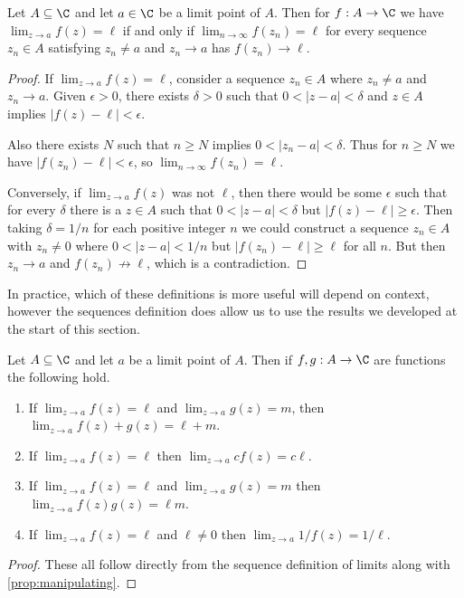\begin{proposition}
	Let $A \subseteq \C$ and let $a \in \C$ be a limit point of $A$. Then for $f:A \rightarrow \C$ we have $\displaystyle\lim_{z \to a} f(z) = \ell$ if and only if $\lim_{n \to \infty} f(z_n) = \ell$ for every sequence $z_n \in A$ satisfying $z_n \neq a$ and $z_n \rightarrow a$ has $f(z_n) \rightarrow \ell$.
\end{proposition}
\begin{proof}
If $\lim_{z \to a} f(z) = \ell$, consider a sequence $z_n \in A$ where $z_n \neq a$ and $z_n \rightarrow a$.
Given $\epsilon > 0$, there exists $\delta > 0$ such that $0 < |z - a| < \delta$ and $z \in A$ implies $|f(z) - \ell| < \epsilon$.

Also there exists $N$ such that $n \geq N$ implies $0 < |z_n - a| < \delta$. Thus for $n \geq N$ we have $|f(z_n) - \ell| < \epsilon$, so $\lim_{n \to \infty} f(z_n) = \ell$. 

Conversely, if $\lim_{z \to a} f(z)$ was not $\ell$, then there would be some $\epsilon$ such that for every $\delta$ there is a $z \in A$ such that $0 < |z - a| < \delta$ but $|f(z) - \ell| \geq \epsilon$. Then taking $\delta = 1/n$ for each positive integer $n$ we could construct a sequence $z_n \in A$ with $z_n \neq 0$ where $0 < |z - a| < 1/n$ but $|f(z_n) - \ell| \geq \ell$ for all $n$. But then $z_n \rightarrow a$ and $f(z_n) \not \rightarrow \ell$, which is a contradiction. 
\end{proof}


In practice, which of these definitions is more useful will depend on context, however the sequences definition does allow us to use the results we developed at the start of this section. 

\begin{proposition}
	Let $A \subseteq \C$ and let $a$ be a limit point of $A$. Then if $f, g: A \rightarrow \C$ are functions the following hold.
	\begin{enumerate}[label=(\roman*)]
		\item If $\lim_{z \to a} f(z) = \ell$ and $\lim_{z \to a} g(z) = m$, then $\lim_{z \to a} f(z) + g(z) = \ell + m$.
		\item If $\lim_{z \to a} f(z) = \ell$ then $\lim_{z \to a} cf(z) = c\ell$.
		\item If $\lim_{z \to a} f(z) = \ell$ and $\lim_{z \to a} g(z) = m$ then $\lim_{z \to a} f(z)g(z) = \ell m$.
		\item If $\lim_{z \to a} f(z) = \ell$ and $\ell \neq 0$ then $\lim_{z \to a} 1/f(z) = 1/\ell$.
	\end{enumerate}
\end{proposition}
\begin{proof}
	These all follow directly from the sequence definition of limits along with \autoref{prop:manipulating}.
\end{proof}


